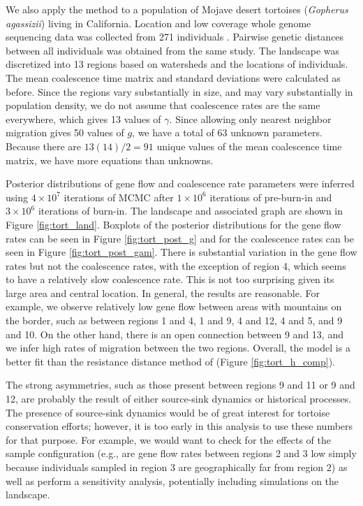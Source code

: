 \documentclass{article}
\begin{document}
We also apply the method to a population of Mojave desert tortoises (\emph{Gopherus agassizii})
living in California. 
Location and low coverage whole genome sequencing data was collected from 271 individuals 
\citep{shaffer2017desert}.
Pairwise genetic distances between all individuals was obtained from the same study.
The landscape was discretized into 13 regions based on watersheds and the locations of individuals.
The mean coalescence time matrix and standard deviations were calculated as before. 
Since the regions vary substantially in size, 
and may vary substantially in population density, 
we do not assume that coalescence rates are the same everywhere, 
which gives 13 values of $\gamma$. 
Since allowing only nearest neighbor migration gives 50 values of $g$, 
we have a total of 63 unknown parameters.
Because there are $13(14)/2 = 91$ unique values of the mean coalescence time matrix, 
we have more equations than unknowns.

Posterior distributions of gene flow and coalescence rate parameters were inferred
using $4 \times 10^7$ iterations of MCMC 
after $1 \times 10^6$ iterations of pre-burn-in and $3 \times 10^6$ iterations of burn-in.
The landscape and associated graph are shown in Figure \ref{fig:tort_land}. 
Boxplots of the posterior distributions for the gene flow rates can be seen in Figure \ref{fig:tort_post_g} 
and for the coalescence rates can be seen in Figure \ref{fig:tort_post_gam}.
There is substantial variation in the gene flow rates 
but not the coalescence rates, 
with the exception of region 4, which seems to have a relatively slow coalescence rate.
This is not too surprising given its large area and central location.
In general, the results are reasonable. 
For example,  we observe relatively low gene flow between areas with mountains on the border, 
such as between regions 1 and 4, 1 and 9, 4 and 12, 4 and 5, and 9 and 10.
On the other hand, there is an open connection between 9 and 13, 
and we infer high rates of migration between the two regions.
Overall, the model is a better fit than the resistance distance method of \citet{shaffer2017desert}
(Figure \ref{fig:tort_h_comp}).

The strong asymmetries, such as those present between regions 9 and 11 or 9 and 12, 
are probably the result of either source-sink dynamics or historical processes. 
The presence of source-sink dynamics would be of great interest for tortoise conservation efforts; 
however, it is too early in this analysis to use these numbers for that purpose.
For example, we would want to check for the effects of the sample configuration 
(e.g., are gene flow rates between regions 2 and 3 low 
simply because individuals sampled in region 3 are geographically far from region 2) 
as well as perform a sensitivity analysis, 
potentially including simulations on the landscape.
\end{document}
